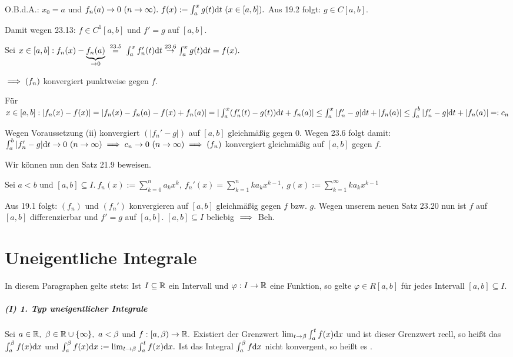 \documentclass[a4paper,oneside,DIV15,BCOR12mm]{scrbook}
\begin{document}
\newcommand{\gehtwegen}[1]{\overset{#1}{\to}}
\newcommand{\gehtnach}[1]{\overset{\text{#1}}{\to}}

\begin{beweis}
O.B.d.A.: $x_0=a$ und $f_n(a) \to 0\ (n \to \infty).\ f(x):=\int_a^x g(t)\dt\ (x \in [a,b]).$ Aus 19.2 folgt: $g \in C[a,b].$

Damit wegen 23.13: $f \in C^1[a,b]$ und $f'=g$ auf $[a,b].$

Sei $x \in [a,b]: f_n(x) - \underbrace{f_n(a)}_{\to 0} \gleichnach{23.5} \int_a^x f_n'(t)\dt \gehtnach{23.6} \int_a^x g(t)\dt = f(x).$

$\implies (f_n)$ konvergiert punktweise gegen $f$.

Für $x \in [a,b]: |f_n(x)-f(x)| = |f_n(x)-f_n(a)-f(x)+f_n(a)| = |\int_a^x (f_n'(t)-g(t))\text{d}t + f_n(a)| \le \int_a^x |f_n'-g|\text{d}t + |f_n(a)| \le \int_a^b |f_n'-g|\text{d}t + |f_n(a)| =: c_n$

Wegen Voraussetzung (ii) konvergiert $(|f_n'-g|)$ auf $[a,b]$ gleichmäßig gegen $0$. Wegen 23.6 folgt damit: $\int_a^b |f_n'-g| \text{d}t \to 0\ (n \to \infty) \implies c_n \to 0\ (n \to \infty) \implies (f_n)$ konvergiert gleichmäßig auf $[a,b]$ gegen $f$.
\end{beweis}

Wir können nun den Satz 21.9 beweisen.

\begin{beweis}
Sei $a<b$ und $[a,b] \subseteq I.\ f_n(x) := \sum_{k=0}^n a_k x^k,\ f_n'(x) = \sum_{k=1}^n ka_kx^{k-1},\ g(x) := \sum_{k=1}^\infty ka_kx^{k-1}$

Aus 19.1 folgt: $(f_n)$ und $(f_n')$ konvergieren auf $[a,b]$ gleichmäßig gegen $f$ bzw. $g$. Wegen unserem neuen Satz 23.20 nun ist $f$ auf $[a,b]$ differenzierbar und $f'=g$ auf $[a,b]$. $[a,b] \subseteq I$ beliebig $\implies$ Beh.
\end{beweis}

\chapter{Uneigentliche Integrale}

In diesem Paragraphen gelte stets: Ist $I \subseteq \mathbb{R}$ ein Intervall und $\varphi: I \to \mathbb{R}$ eine Funktion, so gelte $\varphi \in R[a,b]$ für jedes Intervall $[a,b] \subseteq I$.

\paragraph{(I) 1. Typ uneigentlicher Integrale}
Sei $a \in \mathbb{R},\ \beta \in \mathbb{R} \cup \{\infty\},\ a<\beta$ und $f:[a,\beta) \to \mathbb{R}.$ Existiert der Grenzwert $\lim_{t\to\beta} \int_a^t f(x)\text{d}x$ und ist dieser Grenzwert reell, so heißt das  $\int_a^\beta f(x)\text{d}x$  und $\int_a^\beta f(x)\text{d}x := \lim_{t\to\beta} \int_a^t f(x)\text{d}x.$ Ist das Integral $\int_a^\beta f\text{d}x$ nicht konvergent, so heißt es .
\end{document}
